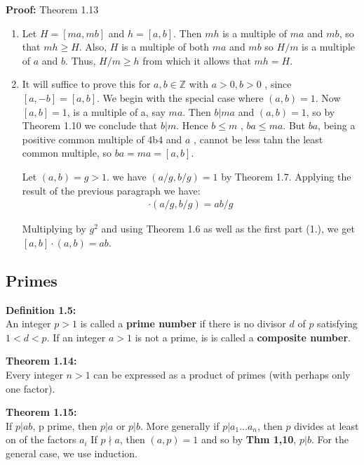 \documentclass[a4paper]{article}
\begin{document}
\textbf{Proof:} Theorem 1.13

\begin{enumerate}
\item Let $H=[ma,mb]$ and $h=[a,b]$. Then $mh$ is a multiple of $ma$ and
$mb$, so that $mh\geq H$. Also, $H$ is a multiple of both $ma$ and $mb$ so
$H/m$ is a multiple of $a$ and $b$. Thus, $H/m \geq h$ from which it allows
that $mh=H$.

\item It will suffice to prove this for $a,b\in\mathbb{Z}$ with $a>0,b>0$
, since $[a,-b]=[a,b]$. We begin with the special case where $(a,b)=1$. Now
$[a,b]=1$, is a multiple of a, say $ma$. Then $b|ma$ and $(a,b)=1$, so by
Theorem 1.10 we conclude that $b|m$. Hence $b \leq m$ , $ba\leq ma$. But
$ba$, being a positive common multiple of 4b4 and $a$ , cannot be less tahn
the least common multiple, so $ba=ma=[a,b]$.

Let $(a,b)=g>1$. we have $(a/g,b/g)=1$ by Theorem 1.7. Applying the result
of the previous paragraph we have:
\begin{align}
[a/g,b/g]\cdot(a/g,b/g)=ab/g
\end{align}

Multiplying by $g^2$ and using Theorem 1.6 as well as the first part (1.),
we get $[a,b]\cdot(a,b)=ab$.
\end{enumerate}


\subsection{Primes}

\textbf{Definition 1.5:}\\
An integer $p>1$ is called a \textbf{prime number} if there is no divisor
$d$ of $p$ satisfying $1<d<p$. If an integer $a>1$ is not a prime, is is
called a \textbf{composite number}.

\textbf{Theorem 1.14:}\\
Every integer $n>1$ can be expressed as a product of primes
(with perhaps only one factor).


\textbf{Theorem 1.15:}\\
If $p|ab$, p prime, then $p|a$ or $p|b$.
More generally if $p|a_1...a_n$, then $p$ divides at least on of the factors $a_i$
If $p\nmid a$, then $(a,p)=1$ and so by \textbf{Thm 1,10}, $p|b$.
For the general case, we use induction.
\end{document}
